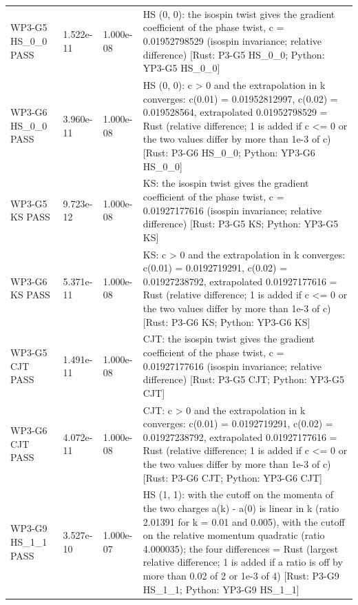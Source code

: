\documentclass[aps,prd,onecolumn,superscriptaddress,nofootinbib,floatfix,longbibliography]{revtex4-2}
\begin{document}
\begin{longtable}{p{}p{}p{}p{}}
WP3-G5 HS\_0\_0 \newline PASS & 1.522e-11 & 1.000e-08 & HS (0, 0): the isospin twist gives the gradient coefficient of the phase twist, c = 0.01952798529 (isospin invariance; relative difference) [Rust: P3-G5 HS\_0\_0; Python: YP3-G5 HS\_0\_0] \\
WP3-G6 HS\_0\_0 \newline PASS & 3.960e-11 & 1.000e-08 & HS (0, 0): c \textgreater{} 0 and the extrapolation in k converges: c(0.01) = 0.01952812997, c(0.02) = 0.019528564, extrapolated 0.01952798529 = Rust (relative difference; 1 is added if c \textless{}= 0 or the two values differ by more than 1e-3 of c) [Rust: P3-G6 HS\_0\_0; Python: YP3-G6 HS\_0\_0] \\
WP3-G5 KS \newline PASS & 9.723e-12 & 1.000e-08 & KS: the isospin twist gives the gradient coefficient of the phase twist, c = 0.01927177616 (isospin invariance; relative difference) [Rust: P3-G5 KS; Python: YP3-G5 KS] \\
WP3-G6 KS \newline PASS & 5.371e-11 & 1.000e-08 & KS: c \textgreater{} 0 and the extrapolation in k converges: c(0.01) = 0.0192719291, c(0.02) = 0.01927238792, extrapolated 0.01927177616 = Rust (relative difference; 1 is added if c \textless{}= 0 or the two values differ by more than 1e-3 of c) [Rust: P3-G6 KS; Python: YP3-G6 KS] \\
WP3-G5 CJT \newline PASS & 1.491e-11 & 1.000e-08 & CJT: the isospin twist gives the gradient coefficient of the phase twist, c = 0.01927177616 (isospin invariance; relative difference) [Rust: P3-G5 CJT; Python: YP3-G5 CJT] \\
WP3-G6 CJT \newline PASS & 4.072e-11 & 1.000e-08 & CJT: c \textgreater{} 0 and the extrapolation in k converges: c(0.01) = 0.0192719291, c(0.02) = 0.01927238792, extrapolated 0.01927177616 = Rust (relative difference; 1 is added if c \textless{}= 0 or the two values differ by more than 1e-3 of c) [Rust: P3-G6 CJT; Python: YP3-G6 CJT] \\
WP3-G9 HS\_1\_1 \newline PASS & 3.527e-10 & 1.000e-07 & HS (1, 1): with the cutoff on the momenta of the two charges a(k) - a(0) is linear in \textbar{}k\textbar{} (ratio 2.01391 for k = 0.01 and 0.005), with the cutoff on the relative momentum quadratic (ratio 4.000035); the four differences = Rust (largest relative difference; 1 is added if a ratio is off by more than 0.02 of 2 or 1e-3 of 4) [Rust: P3-G9 HS\_1\_1; Python: YP3-G9 HS\_1\_1] \\

\end{longtable}
\end{document}
